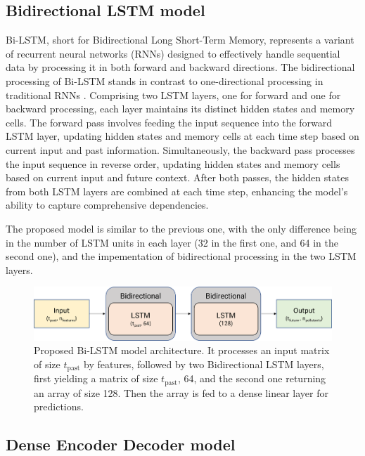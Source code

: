 \subsection{Bidirectional LSTM model}


Bi-LSTM, short for Bidirectional Long Short-Term Memory, represents a variant of recurrent neural networks (RNNs) designed to effectively handle sequential data by processing it in both forward and backward directions.
The bidirectional processing of Bi-LSTM stands in contrast to one-directional processing in traditional RNNs \cite{Schuster1997BidirectionalRN}. Comprising two LSTM layers, one for forward and one for backward processing, each layer maintains its distinct hidden states and memory cells.
The forward pass involves feeding the input sequence into the forward LSTM layer, updating hidden states and memory cells at each time step based on current input and past information. Simultaneously, the backward pass processes the input sequence in reverse order, updating hidden states and memory cells based on current input and future context. After both passes, the hidden states from both LSTM layers are combined at each time step, enhancing the model's ability to capture comprehensive dependencies.

The proposed model is similar to the previous one, with the only difference being in the number of LSTM units in each layer (32 in the first one, and 64 in the second one), and the impementation of bidirectional processing in the two LSTM layers.

\begin{figure}
    \centering
    \includegraphics[width=0.7\linewidth]{images/model architectures/bilstmmodel.png}
    \caption{Proposed Bi-LSTM model architecture. It processes an input matrix of size $t_{\text{past}}$ by features, followed by two Bidirectional LSTM layers, first yielding a matrix of size $t_{\text{past}}$, 64, and the second one returning an array of size 128. Then the array is fed to a dense linear layer for predictions.
    }
    \label{fig:bilstmmodel}
\end{figure}

\subsection{Dense Encoder Decoder model}


